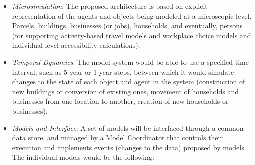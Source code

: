 \begin{itemize}
\item \emph{Microsimulation}: The proposed architecture is based on explicit representation of the agents and objects being modeled at a microscopic level.  Parcels, buildings, businesses (or jobs), households, and eventually, persons (for supporting activity-based travel models and workplace choice models and individual-level accessibility calculations).

\item \emph{Temporal Dynamics}: The model system would be able to use a specified time interval, such as 5-year or 1-year steps, between which it would simulate changes to the state of each object and agent in the system (construction of new buildings or conversion of existing ones, movement of households and businesses from one location to another, creation of new households or businesses).

\item \emph{Models and Interface}: A set of models will be interfaced through a common data store, and managed by a Model Coordinator that controls their execution and implements events (changes to the data) proposed by models.  The individual models would be the following:


\end{itemize}

